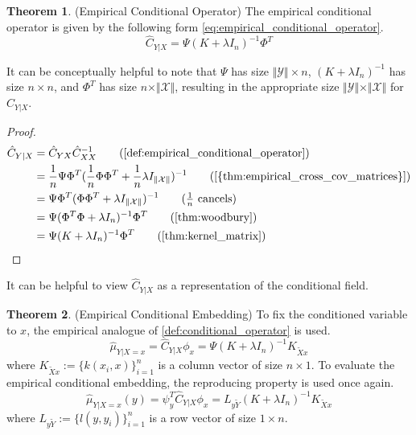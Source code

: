 \documentclass[twoside]{article} \usepackage{aistats2017}
\theoremstyle{definition}
\newtheorem{theorem}{Theorem}[section]
\newcommand{\rv}[1]{{#1}}
\newcommand{\ds}[1]{\tilde{#1}}
\newcommand{\hatmuYx}{\hat{\mu}_{\rv{Y} | \rv{X} = x}}
\newcommand{\hatCyx}{\hat{C}_{\rv{Y} \rv{X}}}
\newcommand{\hatCxx}{\hat{C}_{\rv{X} \rv{X}}}
\newcommand{\hatCylx}{\hat{C}_{\rv{Y} | \rv{X}}}
\newcommand{\cardX}{\Vert \mathcal{X} \Vert}
\newcommand{\cardY}{\Vert \mathcal{Y} \Vert}
\begin{document}
		\begin{theorem} \label{thm:empirical_conditional_operator}
			(Empirical Conditional Operator)
			The empirical conditional operator is given by the following form \eqref{eq:empirical_conditional_operator}.
			\begin{equation}
				\hatCylx = \Psi (K + \lambda I_{n})^{-1} \Phi^{T}
			\label{eq:empirical_conditional_operator}
			\end{equation}
			
			It can be conceptually helpful to note that $\Psi$ has size $\cardY \times n$, $(K + \lambda I_{n})^{-1}$ has size $n \times n$, and $\Phi^{T}$ has size $n \times \cardX$, resulting in the appropriate size $\cardY \times \cardX$ for $\hatCylx$.

			\begin{proof}
				\begin{align*}
					\hatCylx &= \hatCyx \hatCxx^{-1} \tag{\cref{def:empirical_conditional_operator}}\\
					&= \frac{1}{n} \Psi \Phi^{T} (\frac{1}{n} \Phi \Phi^{T} + \frac{1}{n} \lambda I_{\cardX})^{-1} \tag{\cref{{thm:empirical_cross_cov_matrices}}} \\
					&= \Psi \Phi^{T} (\Phi \Phi^{T} + \lambda I_{\cardX})^{-1} \tag{$\frac{1}{n}$ cancels} \\
					&= \Psi (\Phi^{T} \Phi + \lambda I_{n})^{-1} \Phi^{T} \tag{\cref{thm:woodbury}} \\
					&= \Psi (K + \lambda I_{n})^{-1} \Phi^{T} \tag{\cref{thm:kernel_matrix}} \\
				\end{align*}
			\end{proof}
		\end{theorem}
		
		It can be helpful to view $\hatCylx$ as a representation of the conditional field. 
		
		\begin{theorem} \label{thm:empirical_conditional_embedding}
			(Empirical Conditional Embedding)
			To fix the conditioned variable to $x$, the empirical analogue of \cref{def:conditional_operator} is used.
			\begin{equation}
				\hatmuYx = \hatCylx \phi_{x} = \Psi (K + \lambda I_{n})^{-1} K_{\ds{X} x}
			\label{eq:empirical_conditional_embedding}
			\end{equation}
			where $K_{\ds{X} x} := \{k(x_{i}, x)\}_{i = 1}^{n}$ is a column vector of size $n \times 1$.
			To evaluate the empirical conditional embedding, the reproducing property is used once again.
			\begin{equation}
				\hatmuYx(y) = \psi_{y}^{T} \hatCylx \phi_{x} = L_{y \ds{Y}} (K + \lambda I_{n})^{-1} K_{\ds{X} x}
			\label{eq:empirical_conditional_embedding_evaluated}
			\end{equation}
			where $L_{y \ds{Y}} := \{l(y, y_{i})\}_{i = 1}^{n}$ is a row vector of size $1 \times n$.
		\end{theorem}
		
\end{document}
